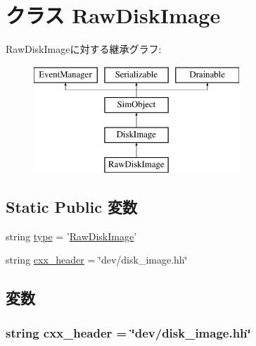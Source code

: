 \hypertarget{classDiskImage_1_1RawDiskImage}{
\section{クラス RawDiskImage}
\label{classDiskImage_1_1RawDiskImage}
}
RawDiskImageに対する継承グラフ:\begin{figure}[H]
\begin{center}
\leavevmode
\includegraphics[height=4cm]{classDiskImage_1_1RawDiskImage}
\end{center}
\end{figure}
\subsection*{Static Public 変数}
\begin{DoxyCompactItemize}
\item 
string \hyperlink{classDiskImage_1_1RawDiskImage_acce15679d830831b0bbe8ebc2a60b2ca}{type} = '\hyperlink{classDiskImage_1_1RawDiskImage}{RawDiskImage}'
\item 
string \hyperlink{classDiskImage_1_1RawDiskImage_a17da7064bc5c518791f0c891eff05fda}{cxx\_\-header} = \char`\"{}dev/disk\_\-image.hh\char`\"{}
\end{DoxyCompactItemize}


\subsection{変数}
\hypertarget{classDiskImage_1_1RawDiskImage_a17da7064bc5c518791f0c891eff05fda}{
\subsubsection[{cxx\_\-header}]{\setlength{\rightskip}{0pt plus 5cm}string {\bf cxx\_\-header} = \char`\"{}dev/disk\_\-image.hh\char`\"{}}}
\label{classDiskImage_1_1RawDiskImage_a17da7064bc5c518791f0c891eff05fda}


